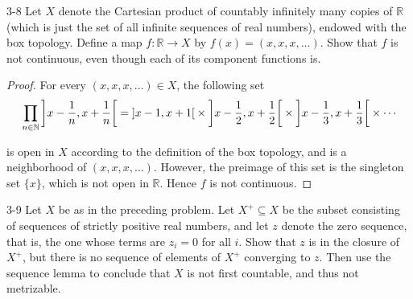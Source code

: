 \begin{problem}{3-8}
Let $X$ denote the Cartesian product of countably infinitely many copies of $\mathbb{R}$ (which is just the set of all infinite sequences of real numbers), endowed with the box topology. Define a map $f: \mathbb{R}\to X$ by $f(x) = (x, x, x, \ldots)$. Show that $f$ is not continuous, even though each of its component functions is.
\end{problem}

\begin{proof}
	For every $(x, x, x, \ldots) \in X$, the following set
	\begin{align*}
		\prod_{n\in\mathbb{N}}\left]{x - \frac{1}{n}, x + \frac{1}{n}}\right[ = \left]{x - 1, x + 1}\right[ \times \left]{x - \frac{1}{2}, x + \frac{1}{2}}\right[ \times \left]{x - \frac{1}{3}, x + \frac{1}{3}}\right[ \times \cdots
	\end{align*}

	is open in $X$ according to the definition of the box topology, and is a neighborhood of $(x, x, x, \ldots)$. However, the preimage of this set is the singleton set $\{ x \}$, which is not open in $\mathbb{R}$. Hence $f$ is not continuous.
\end{proof}

\begin{problem}{3-9}
Let $X$ be as in the preceding problem. Let $X^{+}\subseteq X$ be the subset consisting of sequences of strictly positive real numbers, and let $z$ denote the zero sequence, that is, the one whose terms are $z_{i} = 0$ for all $i$. Show that $z$ is in the closure of $X^{+}$, but there is no sequence of elements of $X^{+}$ converging to $z$. Then use the sequence lemma to conclude that $X$ is not first countable, and thus not metrizable.
\end{problem}

